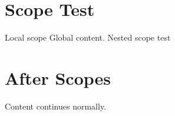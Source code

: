 \documentclass{article}
\begin{document}
\section{Scope Test}
{Local scope}
{\newcommand{\localcmd}{Local}}
Global content.
{Nested {scope {test}}}
\section{After Scopes}
Content continues normally.
\end{document}
